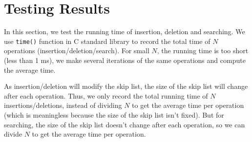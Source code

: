 \section{Testing Results}
In this section, we test the running time of insertion, deletion and searching. We use \texttt{time()} function in C standard library to record the total time of $N$ operations (insertion/deletion/search). For small $N$, the running time is too short (less than 1 ms), we make several iterations of the same operations and compute the average time.\par 
As insertion/deletion will modify the skip list, the size of the skip list will change after each operation. Thus, we only record the total running time of $N$ insertions/deletions, instead of dividing $N$ to get the average time per operation (which is meaningless because the size of the skip list isn't fixed). But for searching, the size of the skip list doesn't change after each operation, so we can divide $N$ to get the average time per operation.
